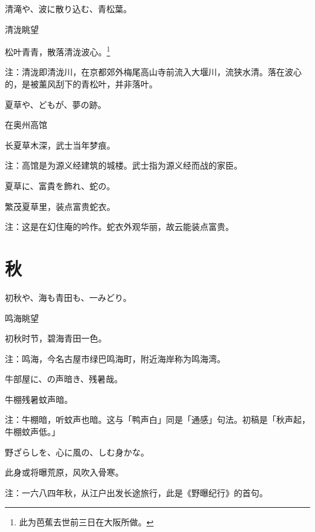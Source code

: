 \begin{haiku}
    {\FH 清滝や、波に散り込む、青松葉。}

    {\FK 清泷眺望}

    {\FK 松叶青青，散落清泷波心。\footnote{\FT 此为芭蕉去世前三日在大阪所做。}}

    {\FT 注：清泷即清泷川，在京都郊外梅尾高山寺前流入大堰川，流狭水清。落在波心的，是被薰风刮下的青松叶，并非落叶。}
\end{haiku}

\begin{haiku}
    {\FH 夏草や、どもが、夢の跡。}

    {\FK 在奥州高馆}

    {\FK 长夏草木深，武士当年梦痕。}

    {\FT 注：高馆是为源义经建筑的城楼。武士指为源义经而战的家臣。}
\end{haiku}

\begin{haiku}
    {\FH 夏草に、富貴を飾れ、蛇の。}

    {\FK 繁茂夏草里，装点富贵蛇衣。}

    {\FT 注：这是在幻住庵的吟作。蛇衣外观华丽，故云能装点富贵。}
\end{haiku}

\section{\FK 秋}

\setcounter{haikucounter}{0}

\begin{haiku}
    {\FH 初秋や、海も青田も、一みどり。}

    {\FK 鸣海眺望}

    {\FK 初秋时节，碧海青田一色。}

    {\FT 注：鸣海，今名古屋市绿巴鸣海町，附近海岸称为鸣海湾。}
\end{haiku}

\begin{haiku}
    {\FH 牛部屋に、の声暗き、残暑哉。}

    {\FK 牛棚残暑蚊声暗。}

    {\FT 注：牛棚暗，听蚊声也暗。这与「鸭声白」同是「通感」句法。初稿是「秋声起，牛棚蚊声低。」}
\end{haiku}

\begin{haiku}
    {\FH 野ざらしを、心に風の、しむ身かな。}

    {\FK 此身或将曝荒原，风吹入骨寒。}

    {\FT 注：一六八四年秋，从江户出发长途旅行，此是《野曝纪行》的首句。}
\end{haiku}

